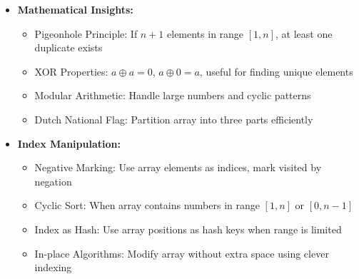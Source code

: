 \documentclass[a4paper,10pt]{book}
\begin{document}
\begin{itemize}[leftmargin=*]
    \item \textbf{Mathematical Insights:}
    \begin{itemize}
        \item Pigeonhole Principle: If $n+1$ elements in range $[1,n]$, at least one duplicate exists
        \item XOR Properties: $a \oplus a = 0$, $a \oplus 0 = a$, useful for finding unique elements
        \item Modular Arithmetic: Handle large numbers and cyclic patterns
        \item Dutch National Flag: Partition array into three parts efficiently
    \end{itemize}
    
    \item \textbf{Index Manipulation:}
    \begin{itemize}
        \item Negative Marking: Use array elements as indices, mark visited by negation
        \item Cyclic Sort: When array contains numbers in range $[1,n]$ or $[0,n-1]$
        \item Index as Hash: Use array positions as hash keys when range is limited
        \item In-place Algorithms: Modify array without extra space using clever indexing
    \end{itemize}
\end{itemize}
\end{document}
